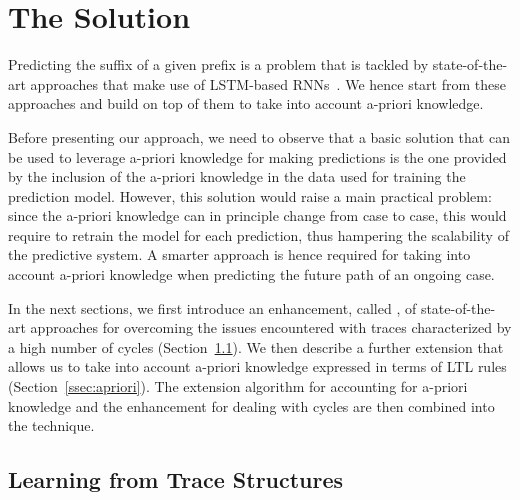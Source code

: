 
\section{The Solution} %
\label{sec:our_approach}

Predicting
the suffix of a given prefix is a problem that is tackled by state-of-the-art approaches that make use of LSTM-based RNNs~\cite{evermann,niek96732}. We hence start from these approaches and build on top of them to take into account a-priori knowledge.


Before presenting our approach, we need to observe that a basic solution that can be used to leverage a-priori knowledge for making predictions is the one provided by the inclusion of the a-priori knowledge in the data used for training the prediction model.
However, this solution would raise a main practical problem: since the a-priori knowledge can in principle change from case to case, this would require to retrain the model for each prediction, thus hampering the scalability of the predictive system. A smarter approach is hence required for taking into account a-priori knowledge when predicting the future path of an ongoing case.

In the next sections, we first introduce an enhancement, called \nocycle, of state-of-the-art approaches for overcoming the issues encountered with traces characterized by a high number of cycles (Section~\ref{ssec:noloop}). We then describe a further extension that allows us to take into account a-priori knowledge expressed in terms of LTL rules (Section~\ref{ssec:apriori}). The extension algorithm for accounting for a-priori knowledge and the enhancement for dealing with cycles are then combined into the \protrack technique.

\subsection{Learning from Trace Structures}
\label{ssec:noloop}

